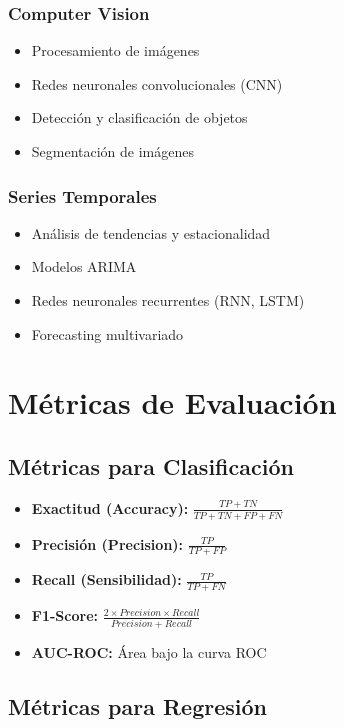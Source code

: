 \subsubsection{Computer Vision}
\begin{itemize}
    \item Procesamiento de imágenes
    \item Redes neuronales convolucionales (CNN)
    \item Detección y clasificación de objetos
    \item Segmentación de imágenes
\end{itemize}

\subsubsection{Series Temporales}
\begin{itemize}
    \item Análisis de tendencias y estacionalidad
    \item Modelos ARIMA
    \item Redes neuronales recurrentes (RNN, LSTM)
    \item Forecasting multivariado
\end{itemize}

\section{Métricas de Evaluación}

\subsection{Métricas para Clasificación}

\begin{itemize}
    \item \textbf{Exactitud (Accuracy):} $\frac{TP + TN}{TP + TN + FP + FN}$
    \item \textbf{Precisión (Precision):} $\frac{TP}{TP + FP}$
    \item \textbf{Recall (Sensibilidad):} $\frac{TP}{TP + FN}$
    \item \textbf{F1-Score:} $\frac{2 \times Precision \times Recall}{Precision + Recall}$
    \item \textbf{AUC-ROC:} Área bajo la curva ROC
\end{itemize}

\subsection{Métricas para Regresión}


